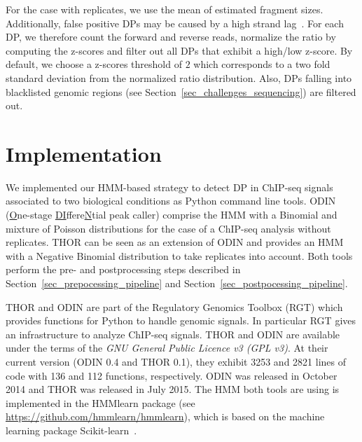 For the case with replicates, we use the mean of estimated fragment sizes.
Additionally, false positive DPs may be caused by a high strand lag~\citep{Pepke2009}.
For each DP, we therefore count the forward and reverse reads, normalize the ratio by computing the z-scores and filter out all DPs that exhibit a high/low z-score.
By default, we choose a z-scores threshold of $2$ which corresponds to a two fold standard deviation from the normalized ratio distribution. 
Also, DPs falling into blacklisted genomic regions (see Section~\ref{sec_challenges_sequencing}) are filtered out.


\section{Implementation}
We implemented our HMM-based strategy to detect DP in ChIP-seq signals associated to two biological conditions as Python command line tools.
ODIN (\underline{O}ne-stage \underline{DI}ffere\underline{N}tial peak caller) comprise the HMM with a Binomial and mixture of Poisson distributions for the case of a ChIP-seq analysis without replicates.
THOR can be seen as an extension of ODIN and provides an HMM with a Negative Binomial distribution to take replicates into account.
Both tools perform the pre- and postprocessing steps described in Section~\ref{sec_prepocessing_pipeline} and Section~\ref{sec_postpocessing_pipeline}.

THOR and ODIN are part of the Regulatory Genomics Toolbox (RGT) which provides functions for Python to handle genomic signals.
In particular RGT gives an infrastructure to analyze ChIP-seq signals.
THOR and ODIN are available under the terms of the \textit{GNU General Public Licence v3 (GPL v3)}.
At their current version (ODIN 0.4 and THOR 0.1), they exhibit 3253 and 2821 lines of code with 136 and 112 functions, respectively.
ODIN was released in October 2014 and THOR was released in July 2015.
The HMM both tools are using is implemented in the HMMlearn package (see \url{https://github.com/hmmlearn/hmmlearn}), which is based on the machine learning package Scikit-learn~\citep{pedregosa2011}.

